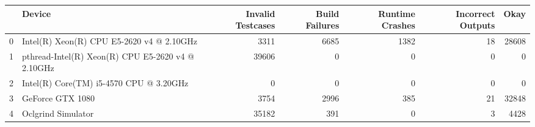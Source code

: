 \begin{tabular}{llrrrrr}
\toprule
{} &                                             Device &  Invalid Testcases &  Build Failures &  Runtime Crashes &  Incorrect Outputs &   Okay \\
\midrule
0 &          Intel(R) Xeon(R) CPU E5-2620 v4 @ 2.10GHz &               3311 &            6685 &             1382 &                 18 &  28608 \\
1 &  pthread-Intel(R) Xeon(R) CPU E5-2620 v4 @ 2.10GHz &              39606 &               0 &                0 &                  0 &      0 \\
2 &            Intel(R) Core(TM) i5-4570 CPU @ 3.20GHz &                  0 &               0 &                0 &                  0 &      0 \\
3 &                                   GeForce GTX 1080 &               3754 &            2996 &              385 &                 21 &  32848 \\
4 &                                 Oclgrind Simulator &              35182 &             391 &                0 &                  3 &   4428 \\
\bottomrule
\end{tabular}
